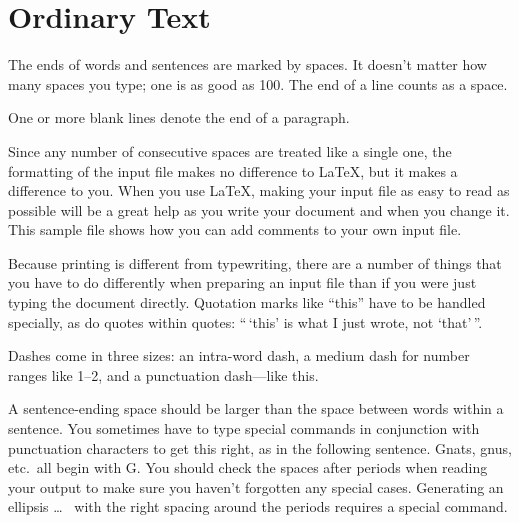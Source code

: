 	\chapter{Ordinary Text} 	%
	

	
	The ends  of words and sentences are marked 
	by   spaces. It  doesn't matter how many 
	spaces    you type; one is as good as 100.  The
	end of   a line counts as a space.
	
	One   or more   blank lines denote the  end 
	of  a paragraph.  
	
	Since any number of consecutive spaces are treated
	like a single one, the formatting of the input
	file makes no difference to
	\LaTeX,                %
	but it makes a difference to you.  When you use 
	\LaTeX \cite{lamport94},  %
	making your input file as easy to read
	as possible will be a great help as you write 
	your document and when you change it.  This sample 
	file shows how you can add comments to your own input 
	file.
	
	Because printing is different from typewriting,
	there are a number of things that you have to do
	differently when preparing an input file than if
	you were just typing the document directly.
	Quotation marks like
	``this'' 
	have to be handled specially, as do quotes within
	quotes:
	``\,`this'            %
	is what I just 
	wrote, not  `that'\,''.  
	
	Dashes come in three sizes: an 
	intra-word 
	dash, a medium dash for number ranges like 
	1--2, 
	and a punctuation 
	dash---like 
	this.
	
	A sentence-ending space should be larger than the
	space between words within a sentence.  You
	sometimes have to type special commands in
	conjunction with punctuation characters to get
	this right, as in the following sentence.
	Gnats, gnus, etc.\ all  %
	begin with G\@.         %
	You should check the spaces after periods when
	reading your output to make sure you haven't
	forgotten any special cases.  Generating an
	ellipsis
	\ldots\               %
	with the right spacing around the periods requires
	a special command.
	
